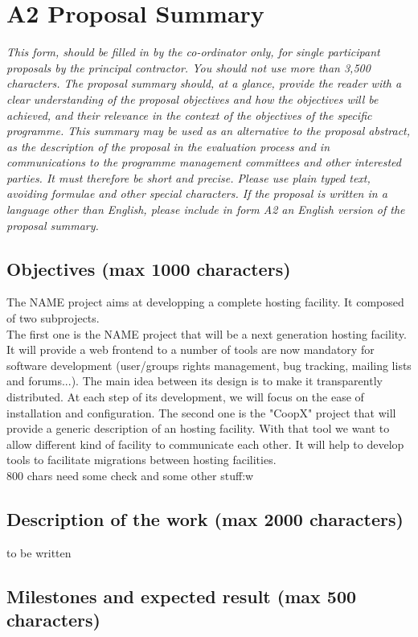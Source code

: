 \documentclass[a4paper,11pt]{report}
\begin{document}
\section*{A2 Proposal Summary}
\textit{This form, should be filled in by the co-ordinator only, for single
participant proposals by the principal contractor. You should not use more than
3,500 characters. The proposal summary should, at a glance, provide the reader
with a clear understanding of the proposal objectives and how the objectives
will be achieved, and their relevance in the context of the objectives of the
specific programme. This summary may be used as an alternative to the proposal
abstract, as the description of the proposal in the evaluation process and in
communications to the programme management committees and other interested
parties. It must therefore be short and precise. Please use plain typed text,
avoiding formulae and other special characters. If the proposal is written in a
language other than English, please include in form A2 an English version of
the proposal summary.} \\
\subsection*{Objectives (max 1000 characters)}
The NAME project aims at developping a complete hosting facility. It composed
of two subprojects. \\
The first one is the NAME project that will be a next generation hosting
facility. It will provide a web frontend to a number of tools are now mandatory
for software development (user/groups rights management, bug tracking, mailing
lists and forums...). The main idea between its design is to make it
transparently distributed. At each step of its development, we will focus on
the ease of installation and configuration.
The second one is the "CoopX" project that will provide a generic description of
an hosting facility. With that tool we want to allow different kind of facility
to communicate each other. It will help to develop tools to facilitate
migrations between hosting facilities.
\\ 800 chars need some check and some other stuff:w
\subsection*{Description of the work (max 2000 characters)} to be written
\subsection*{Milestones and expected result (max 500 characters)}
\end{document}
